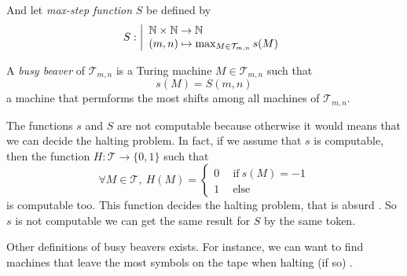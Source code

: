 \documentclass{report}
\begin{document}
\noindent And let \emph{max-step function} $S$ be defined by
\[
S : \left |
  \begin{array}{l}
    \mathbb{N} \times \mathbb{N} \to \mathbb{N}\\
    (m,n) \mapsto \max_{M \in \mathcal{T}_{m,n}} s(M)
  \end{array}
\right .
\]


\noindent A \emph{busy beaver} of $\mathcal{T}_{m,n}$ is a Turing machine $M \in \mathcal{T}_{m,n}$ such that \[s(M) = S(m,n)\] \ie a machine that permforms the most shifts among all machines of $\mathcal{T}_{m,n}$.

\begin{Rem}
  The functions $s$ and $S$ are not computable because otherwise it would means that we can decide the halting problem. In fact, if we assume that $s$ is computable, then the function $H : \mathcal{T} \to \{0,1\}$ such that
  \[
  \forall M \in \mathcal{T},\ H(M) =
  \left \{
    \begin{array}{l}
      0\quad \ \text{if}\ s(M) = -1\\
      1\quad \ \text{else} 
    \end{array}
  \right .
  \]
  is computable too. This function decides the halting problem, that is absurd \cite{turing}. So $s$ is not computable we can get the same result for $S$ by the same token.
\end{Rem}

\begin{Rem}
  Other definitions of busy beavers exists. For instance, we can want to find machines that leave the most symbols on the tape when halting (if so) \cite{rado}.  
\end{Rem}





\end{document}
